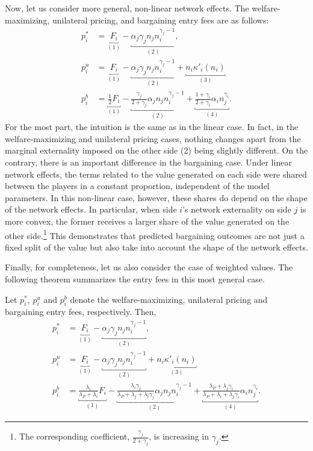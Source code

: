 Now, let us consider more general, non-linear network effects.
The welfare-maximizing, unilateral pricing, and bargaining entry fees are as follows:
\begin{align*}
    p_i^* &= \underbracket{F_i}_{(1)} - \underbracket{\alpha_j \gamma_j n_j n_i^{\gamma_j - 1}}_{(2)}, \\
    p_i^u &= \underbracket{F_i}_{(1)} - \underbracket{\alpha_j \gamma_j n_j n_i^{\gamma_j - 1}}_{(2)} + \underbracket{n_i \kappa'_i(n_i)}_{(3)} \\
    p_i^b &= \underbracket{\frac{1}{2} F_i}_{(1)} - \underbracket{\frac{\gamma_j}{2 + \gamma_j} \alpha_j n_j n_i^{\gamma_j - 1}}_{(2)} + \underbracket{\frac{1 + \gamma_i}{2 + \gamma_i} \alpha_i n_j^{\gamma_i}}_{(4)}.
\end{align*}
For the most part, the intuition is the same as in the linear case.
In fact, in the welfare-maximizing and unilateral pricing cases, nothing changes apart from the marginal externality imposed on the other side (2) being slightly different.
On the contrary, there is an important difference in the bargaining case.
Under linear network effects, the terms related to the value generated on each side were shared between the players in a constant proportion, independent of the model parameters.
In this non-linear case, however, these shares do depend on the shape of the network effects.
In particular, when side $i$'s network externality on side $j$ is more convex, the former receives a larger share of the value generated on the other side.\footnote{
    The corresponding coefficient, $\frac{\gamma_j}{2 + \gamma_j}$, is increasing in $\gamma_j$.
}
This demonstrates that predicted bargaining outcomes are not just a fixed split of the value but also take into account the shape of the network effects.

Finally, for completeness, let us also consider the case of weighted values.
The following theorem summarizes the entry fees in this most general case.
\begin{theorem}
    \label{prop:all_entry_fees}
    Let $p_i^*$, $p_i^u$ and $p_i^b$ denote the welfare-maximizing, unilateral pricing and bargaining entry fees, respectively.
    Then,
    \begin{align*}
        p_i^* &= \underbracket{F_i}_{(1)} - \underbracket{\alpha_j \gamma_j n_j n_i^{\gamma_j - 1}}_{(2)}, \\
        p_i^u &= \underbracket{F_i}_{(1)} - \underbracket{\alpha_j \gamma_j n_j n_i^{\gamma_j - 1}}_{(2)} + \underbracket{n_i \kappa'_i(n_i)}_{(3)} \\
        p_i^b &= \underbracket{\frac{\lambda_i}{\lambda_P + \lambda_i} F_i}_{(1)} - \underbracket{\frac{\lambda_i \gamma_j}{\lambda_P + \lambda_j + \lambda_i\gamma_j} \alpha_j n_j n_i^{\gamma_j - 1}}_{(2)} + \underbracket{\frac{\lambda_P + \lambda_j\gamma_i}{\lambda_P + \lambda_i + \lambda_j\gamma_i} \alpha_i n_j^{\gamma_i}}_{(4)}.
    \end{align*}
\end{theorem}

